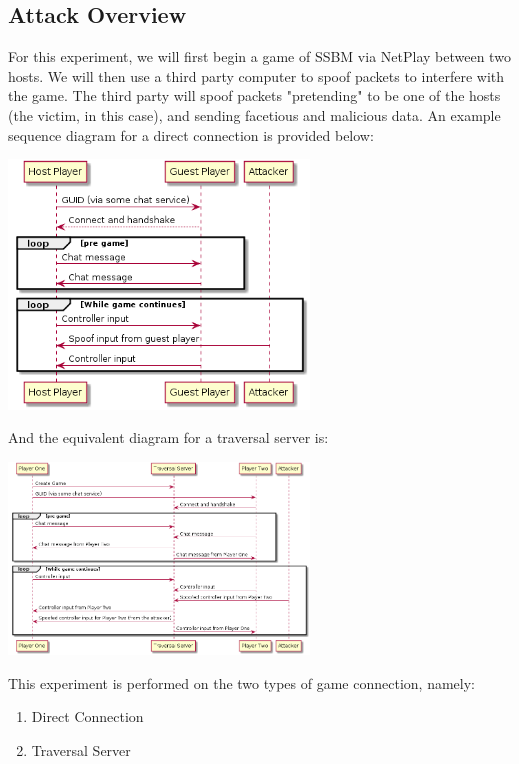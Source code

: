 \documentclass[conference]{IEEEtran}
\begin{document}
\subsection{Attack Overview}
For this experiment, we will first begin a game of SSBM via NetPlay between two hosts.
We will then use a third party computer to spoof packets to interfere with the game.
The third party will spoof packets "pretending" to be one of the hosts (the victim, in this case), and sending facetious and malicious data.
An example sequence diagram for a direct connection is provided below:
\begin{center}
\includegraphics[width=8cm]{Figures/Sequence1}
\end{center}
\vspace{0.5cm}
And the equivalent diagram for a traversal server is:
\begin{center}
\includegraphics[width=8cm]{Figures/Sequence2}
\end{center}
\vspace{0.5cm}
This experiment is performed on the two types of game connection, namely:
\vspace{0.5cm}
\begin{enumerate}  
\item Direct Connection
\item Traversal Server
\end{enumerate}
\vspace{0.5cm}
\end{document}
